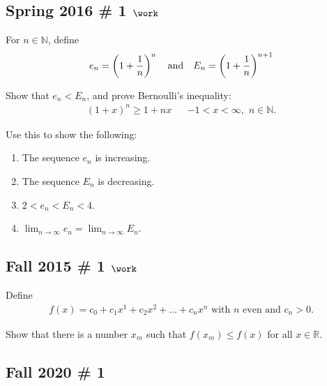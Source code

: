 \begin{solution}
\end{solution}

\hypertarget{spring-2016-1-work}{%
\subsection{\texorpdfstring{Spring 2016 \# 1
\(\work\)}{Spring 2016 \# 1 \textbackslash work}}\label{spring-2016-1-work}}

For \(n\in {\mathbb{N}}\), define
\begin{align*}
e_{n} = \left (1+ {1\over n} \right)^{n} 
{\quad \operatorname{and} \quad}
E_{n} = \left( 1+ {1\over n} \right)^{n+1}
\end{align*}

Show that \(e_n < E_n\), and prove Bernoulli's inequality:
\begin{align*}
(1+x)^n \geq 1+nx && -1 < x < \infty  ,\,\, n\in {\mathbb{N}}
.\end{align*}

Use this to show the following:

\begin{enumerate}
\def\labelenumi{\arabic{enumi}.}
\tightlist
\item
  The sequence \(e_n\) is increasing.
\item
  The sequence \(E_n\) is decreasing.
\item
  \(2 < e_n < E_n < 4\).
\item
  \(\lim _{n \to \infty} e_{n} = \lim _{n \to \infty} E_{n}\).
\end{enumerate}

\hypertarget{fall-2015-1-work}{%
\subsection{\texorpdfstring{Fall 2015 \# 1
\(\work\)}{Fall 2015 \# 1 \textbackslash work}}\label{fall-2015-1-work}}

Define
\begin{align*}
f(x)=c_{0}+c_{1} x^{1}+c_{2} x^{2}+\ldots+c_{n} x^{n} \text { with } n \text { even and } c_{n}>0.
\end{align*}

Show that there is a number \(x_m\) such that \(f(x_m) \leq f(x)\) for
all \(x\in {\mathbb{R}}\).

\hypertarget{fall-2020-1}{%
\subsection{Fall 2020 \# 1}\label{fall-2020-1}}

